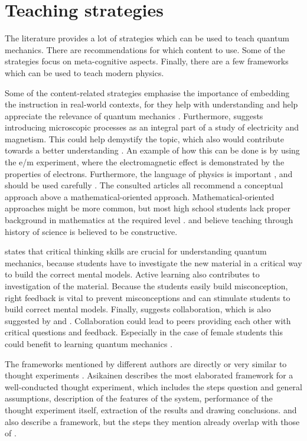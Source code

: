 \documentclass[11pt,twoside]{report} %
\begin{document}
\section{Teaching strategies}

The literature provides a lot of strategies which can be used to teach quantum mechanics. There are recommendations for which content to use. Some of the strategies focus on meta-cognitive aspects. Finally, there are a few frameworks which can be used to teach modern physics.

Some of the content-related strategies emphasise the importance of embedding the instruction in real-world contexts, for they help with understanding \cite{mckagan,thacker,dori} and help appreciate the relevance of quantum mechanics \cite{barnes, henriksen, mckagan}. Furthermore,  suggests introducing microscopic processes as an integral part of a study of electricity and magnetism. This could help demystify the topic, which also would contribute towards a better understanding \cite{barnes, muller}. An example of how this can be done is by using the e/m experiment, where the electromagnetic effect is demonstrated by the properties of electrons. Furthermore, the language of physics is important \cite{henriksen}, and should be used carefully \cite{mckagan}. The consulted articles all recommend a conceptual approach above a mathematical-oriented approach. Mathematical-oriented approaches might be more common, but most high school students lack proper background in mathematics at the required level \cite{dori}.  and  believe teaching through history of science is believed to be constructive.

 states that critical thinking skills are crucial for understanding quantum mechanics, because students have to investigate the new material in a critical way to build the correct mental models. Active learning also contributes to investigation of the material. Because the students easily build misconception, right feedback is vital to prevent misconceptions and can stimulate students to build correct mental models. Finally,  suggests collaboration, which is also suggested by  and . Collaboration could lead to peers providing each other with critical questions and feedback. Especially in the case of female students this could benefit to learning quantum mechanics \cite{adegoke}. 

The frameworks mentioned by different authors are directly or very similar to thought experiments \cite{asikainen, erduran, levrini, velentzas}. Asikainen describes the most elaborated framework for a well-conducted thought experiment, which includes the steps question and general assumptions, description of the features of the system, performance of the thought experiment itself, extraction of the results and drawing conclusions.  and  also describe a framework, but the steps they mention already overlap with those of .
\end{document}
